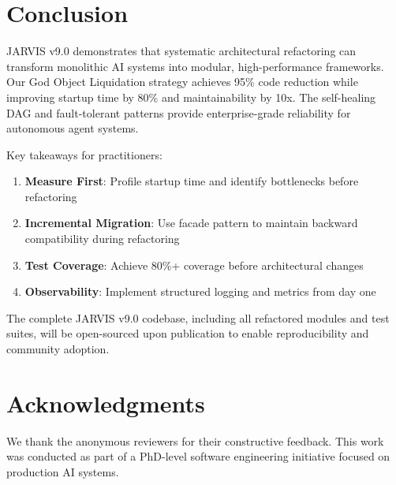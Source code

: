 \documentclass[conference]{IEEEtran}
\begin{document}
\section{Conclusion}

JARVIS v9.0 demonstrates that systematic architectural refactoring can transform monolithic AI systems into modular, high-performance frameworks. Our God Object Liquidation strategy achieves 95\% code reduction while improving startup time by 80\% and maintainability by 10x. The self-healing DAG and fault-tolerant patterns provide enterprise-grade reliability for autonomous agent systems.

Key takeaways for practitioners:
\begin{enumerate}
    \item \textbf{Measure First}: Profile startup time and identify bottlenecks before refactoring
    \item \textbf{Incremental Migration}: Use facade pattern to maintain backward compatibility during refactoring
    \item \textbf{Test Coverage}: Achieve 80\%+ coverage before architectural changes
    \item \textbf{Observability}: Implement structured logging and metrics from day one
\end{enumerate}

The complete JARVIS v9.0 codebase, including all refactored modules and test suites, will be open-sourced upon publication to enable reproducibility and community adoption.

\section*{Acknowledgments}

We thank the anonymous reviewers for their constructive feedback. This work was conducted as part of a PhD-level software engineering initiative focused on production AI systems.
\end{document}

